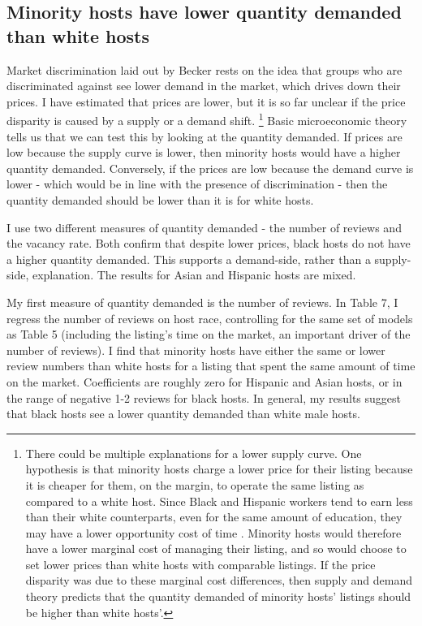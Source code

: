 \subsection{Minority hosts have lower quantity demanded than white hosts}

Market discrimination laid out by Becker rests on the idea that groups who are discriminated against see lower demand in the market, which drives down their prices. I have estimated that prices are lower, but it is so far unclear if the price disparity is caused by a supply or a demand shift.%
	\footnote{There could be multiple explanations for a lower supply curve. One hypothesis is that minority hosts charge a lower price for their listing because it is cheaper for them, on the margin, to operate the same listing as compared to a white host. Since Black and Hispanic workers tend to earn less than their white counterparts, even for the same amount of education, they may have a lower opportunity cost of time \citep{wages}. Minority hosts would therefore have a lower marginal cost of managing their listing, and so would choose to set lower prices than white hosts with comparable listings. If the price disparity was due to these marginal cost differences, then supply and demand theory predicts that the quantity demanded of minority hosts' listings should be higher than white hosts'.}
Basic microeconomic theory tells us that we can test this by looking at the quantity demanded. If prices are low because the supply curve is lower, then minority hosts would have a higher quantity demanded. Conversely, if the prices are low because the demand curve is lower - which would be in line with the presence of discrimination - then the quantity demanded should be lower than it is for white hosts. 
 
I use two different measures of quantity demanded - the number of reviews and the vacancy rate. Both confirm that despite lower prices, black hosts do not have a higher quantity demanded. This supports a demand-side, rather than a supply-side, explanation. The results for Asian and Hispanic hosts are mixed. 

My first measure of quantity demanded is the number of reviews. In Table 7, I regress the number of reviews on host race, controlling for the same set of models as Table 5 (including the listing's time on the market, an important driver of the number of reviews). I find that minority hosts have either the same or lower review numbers than white hosts for a listing that spent the same amount of time on the market. Coefficients are roughly zero for Hispanic and Asian hosts, or in the range of negative 1-2 reviews for black hosts. In general, my results suggest that black hosts see a lower quantity demanded than white male hosts.

